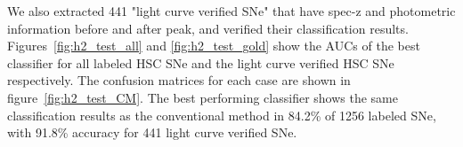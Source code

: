\documentclass[useamsfonts]{pasj01}
\begin{document}
We also extracted 441 "light curve verified SNe" that have spec-z and photometric information before and after peak, and verified their classification results.
Figures\ \ref{fig:h2_test_all} and \ref{fig:h2_test_gold} show the AUCs of the best classifier for all labeled HSC SNe and the light curve verified HSC SNe respectively.
The confusion matrices for each case are shown in figure\ \ref{fig:h2_test_CM}.
The best performing classifier shows the same classification results as the conventional method in 84.2\% of 1256 labeled SNe, with 91.8\% accuracy for 441 light curve verified SNe.
%
%
%
%
\end{document}

